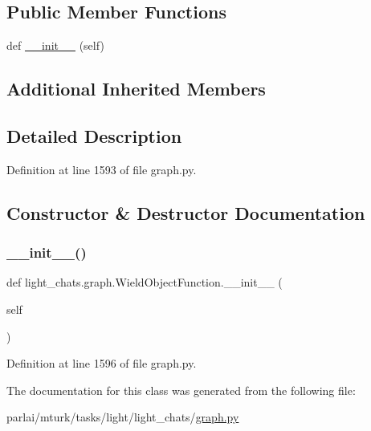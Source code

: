 \subsection*{Public Member Functions}
\begin{DoxyCompactItemize}
\item 
def \hyperlink{classlight__chats_1_1graph_1_1WieldObjectFunction_ae69815477d6c421c497848881eecf124}{\+\_\+\+\_\+init\+\_\+\+\_\+} (self)
\end{DoxyCompactItemize}
\subsection*{Additional Inherited Members}


\subsection{Detailed Description}
\begin{DoxyVerb}\end{DoxyVerb}
 

Definition at line 1593 of file graph.\+py.



\subsection{Constructor \& Destructor Documentation}
\mbox{\label{classlight__chats_1_1graph_1_1WieldObjectFunction_ae69815477d6c421c497848881eecf124}} 
\subsubsection{\texorpdfstring{\+\_\+\+\_\+init\+\_\+\+\_\+()}{\_\_init\_\_()}}
{\footnotesize\ttfamily def light\+\_\+chats.\+graph.\+Wield\+Object\+Function.\+\_\+\+\_\+init\+\_\+\+\_\+ (\begin{DoxyParamCaption}\item[{}]{self }\end{DoxyParamCaption})}



Definition at line 1596 of file graph.\+py.



The documentation for this class was generated from the following file\+:\begin{DoxyCompactItemize}
\item 
parlai/mturk/tasks/light/light\+\_\+chats/\hyperlink{parlai_2mturk_2tasks_2light_2light__chats_2graph_8py}{graph.\+py}\end{DoxyCompactItemize}
